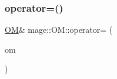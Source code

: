 \hypertarget{structmage_1_1_o_m_aef1ed26f848f0bf57b4e92cddd7ad8e5}{}\label{structmage_1_1_o_m_aef1ed26f848f0bf57b4e92cddd7ad8e5} 
\subsubsection{\texorpdfstring{operator=()}{operator=()}\hspace{0.1cm}{\footnotesize\ttfamily [2/2]}}
{\footnotesize\ttfamily \hyperlink{structmage_1_1_o_m}{OM}\& mage\+::\+O\+M\+::operator= (\begin{DoxyParamCaption}\item[{\hyperlink{structmage_1_1_o_m}{OM} \&\&}]{om }\end{DoxyParamCaption})\hspace{0.3cm}{\ttfamily [delete]}}


